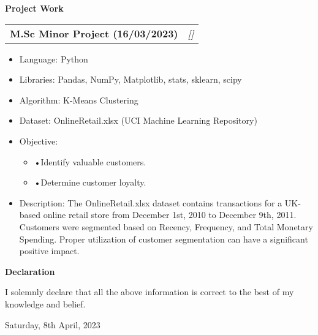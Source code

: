 \documentclass[a4paper,10pt]{article}
\makeatletter
\newcommand{\resitem}[1]{\item #1}
\newcommand{\resheading}[1]{\vspace{0.5em} {\small \colorbox{mygrey}{{\begin{minipage}{0.975\textwidth}{{\textbf{#1}}}\end{minipage}}}} \vspace{0.5em}}
\newcommand{\ressubheading}[3]{\begin{tabular*}{6.62in}{l @{\extracolsep{\fill}} r} \textbf{#1} & \textit{[#2]} \\ \end{tabular*}\vspace{-8pt}}
\makeatother
\begin{document}
\resheading{Project Work}
\ressubheading{M.Sc Minor Project (16/03/2023)}{}{Customer Segmentation using K-means Clustering}
\begin{itemize}[nosep]
    \resitem{Language: Python}
    \resitem{Libraries: Pandas, NumPy, Matplotlib, stats, sklearn, scipy}
    \resitem{Algorithm: K-Means Clustering}
    \resitem{Dataset: OnlineRetail.xlsx (UCI Machine Learning Repository)}
    \resitem{Objective:}
    \begin{itemize}[nosep]
        \resitem{•Identify valuable customers.}
        \resitem{•Determine customer loyalty.}
    \end{itemize}
    \resitem{Description: The OnlineRetail.xlsx dataset contains transactions for a UK-based online retail store from December 1st, 2010 to December 9th, 2011. Customers were segmented based on Recency, Frequency, and Total Monetary Spending. Proper utilization of customer segmentation can have a significant positive impact.}
\end{itemize}

\resheading{Declaration}
I solemnly declare that all the above information is correct to the best of my knowledge and belief.

\vspace{0.5cm}
Saturday, 8th April, 2023
\end{document}
